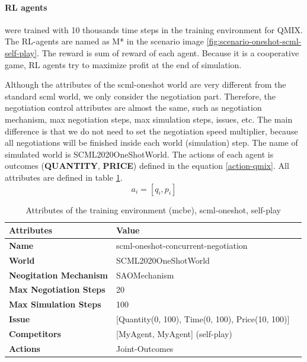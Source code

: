 \paragraph{RL agents} were trained with 10 thousands time steps in the training environment for QMIX. The RL-agents are named as M* in the scenario image \ref{fig:scenario-oneshot-scml-self-play}. The reward is sum of reward of each agent. Because it is a cooperative game, RL agents try to maximize profit at the end of simulation.

Although the attributes of the scml-oneshot world are very different from the standard scml world, we only consider the negotiation part. Therefore, the negotiation control attributes are almost the same, such as negotiation mechanism, max negotiation steps, max simulation steps, issues, etc.
The main difference is that we do not need to set the negotiation speed multiplier, because all negotiations will be finished inside each world (simulation) step. The name of simulated world is SCML2020OneShotWorld. The actions of each agent is outcomes (\textbf{QUANTITY}, \textbf{PRICE}) defined in the equation \ref{action-qmix}. All attributes are defined in table \ref{tab:attributes-mcbe-concurrent-negotiation-scml-oneshot}.
\begin{equation} \label{action-qmix}
a_{i} = [q_i, p_i]
\end{equation}

\begin{table}[htbp]
\centering
\begin{tabular}{l l l} \toprule
\bfseries \textbf{Attributes}    & \bfseries \textbf{Value}                                             \\ \midrule
\textbf{Name}                    & scml-oneshot-concurrent-negotiation                                  \\
\textbf{World}                   & SCML2020OneShotWorld                                                 \\
\textbf{Neogitation Mechanism}   & SAOMechanism                                                         \\
\textbf{Max Negotiation Steps}   & 20                                                                  \\
\textbf{Max Simulation Steps}    & 100                                                                   \\
\textbf{Issue}             	     & [Quantity(0, 100), Time(0, 100), Price(10, 100)]                     \\
\textbf{Competitors}             & [MyAgent, MyAgent] (self-play)                                       \\
\textbf{Actions}                 & Joint-Outcomes                                                             \\
\bottomrule
\end{tabular}
\caption{Attributes of the training environment (mcbe), scml-oneshot, self-play}
\label{tab:attributes-mcbe-concurrent-negotiation-scml-oneshot}
\end{table}

